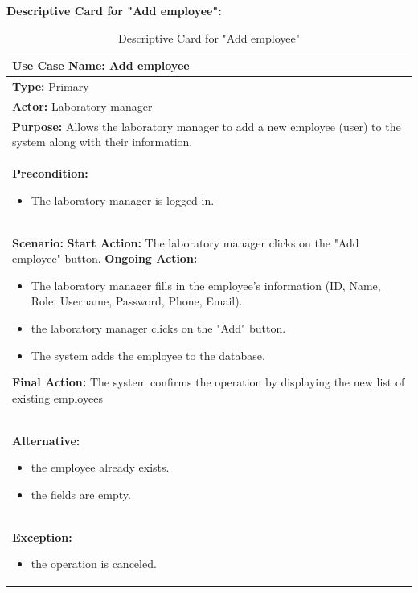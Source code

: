 \documentclass{article}
\begin{document}
\newpage

\textbf{Descriptive Card for "Add employee":}

\begin{table}[h]
\setlength{\tabcolsep}{10pt}
\renewcommand{\arraystretch}{1.5}
    \begin{tabular}{|p{\linewidth}|}
        \hline
        \textbf{Use Case Name:} Add employee\\ 
        \hline
        \textbf{Type:} Primary\\ 
        \hline
        \textbf{Actor:} Laboratory manager\\ 
        \hline
        \textbf{Purpose:} Allows the laboratory manager to add a new employee (user) to the system along with their information.\\ 
        \hline
        \textbf{Precondition:} 
        \begin{itemize}
            \item The laboratory manager is logged in.
        \end{itemize}\\ 
        \hline
        \textbf{Scenario:}
        \vspace{0.2cm}
        \newline
        \vspace{0.2cm}
        \textbf{Start Action:} The laboratory manager clicks on the "Add employee" button.
        \newline
        \textbf{Ongoing Action:}  
        \begin{itemize}
            \item The laboratory manager fills in the employee's information (ID, Name, Role, Username, Password, Phone, Email).
            \item the laboratory manager clicks on the "Add" button.
            \item The system adds the employee to the database.
        \end{itemize}
        \textbf{Final Action:} The system confirms the operation by displaying the new list of existing employees\\
        \hline
        \textbf{Alternative:} 
        \begin{itemize}
            \item the employee already exists.
            \item the fields are empty.
        \end{itemize}\\ 
        \hline
        \textbf{Exception:}
        \begin{itemize}
            \item the operation is canceled.
        \end{itemize}\\ 
        \hline
    \end{tabular}
    \caption{Descriptive Card for "Add employee"}
    \label{tab:my-table}
\end{table}
\end{document}
